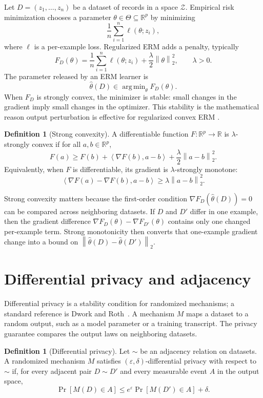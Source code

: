 \documentclass[11pt,a4paper]{report}
\theoremstyle{plain}
\theoremstyle{definition}
\newtheorem{definition}[theorem]{Definition}
\theoremstyle{remark}
\DeclareMathOperator*{\argmin}{arg\,min}
\newcommand{\R}{\mathbb{R}}
\newcommand{\cZ}{\mathcal{Z}}
\newcommand{\norm}[1]{\left\lVert #1\right\rVert}
\newcommand{\inner}[2]{\left\langle #1,#2\right\rangle}
\begin{document}
Let $D=(z_1,\ldots,z_n)$ be a dataset of records in a space $\cZ$.  Empirical risk minimization chooses a parameter $\theta\in\Theta\subseteq\R^p$ by minimizing
\[
    \frac{1}{n}\sum_{i=1}^n \ell(\theta;z_i),
\]
where $\ell$ is a per-example loss.  Regularized ERM adds a penalty, typically
\[
F_D(\theta)
=
\frac{1}{n}\sum_{i=1}^n\ell(\theta;z_i)
+
\frac{\lambda}{2}\norm{\theta}_2^2,
\qquad \lambda>0.
\]
The parameter released by an ERM learner is
\[
\hat\theta(D)\in\argmin_{\theta}F_D(\theta).
\]
When $F_D$ is strongly convex, the minimizer is stable: small changes in the gradient imply small changes in the optimizer.  This stability is the mathematical reason output perturbation is effective for regularized convex ERM \cite{chaudhuri2011erm}.

\begin{definition}[Strong convexity]
A differentiable function $F:\R^p\to\R$ is $\lambda$-strongly convex if for all $a,b\in\R^p$,
\[
F(a)\ge F(b)+\inner{\nabla F(b)}{a-b}+\frac{\lambda}{2}\norm{a-b}_2^2.
\]
Equivalently, when $F$ is differentiable, its gradient is $\lambda$-strongly monotone:
\[
\inner{\nabla F(a)-\nabla F(b)}{a-b}\ge \lambda\norm{a-b}_2^2.
\]
\end{definition}

Strong convexity matters because the first-order condition $\nabla F_D(\hat\theta(D))=0$ can be compared across neighboring datasets.  If $D$ and $D'$ differ in one example, then the gradient difference $\nabla F_D(\theta)-\nabla F_{D'}(\theta)$ contains only one changed per-example term.  Strong monotonicity then converts that one-example gradient change into a bound on $\norm{\hat\theta(D)-\hat\theta(D')}_2$.

\section{Differential privacy and adjacency}
\label{sec:bg-dp}

Differential privacy is a stability condition for randomized mechanisms; a standard reference is Dwork and Roth~\cite{dwork2014book}.  A mechanism $M$ maps a dataset to a random output, such as a model parameter or a training transcript.  The privacy guarantee compares the output laws on neighboring datasets.

\begin{definition}[Differential privacy]
Let $\sim$ be an adjacency relation on datasets.  A randomized mechanism $M$ satisfies $(\varepsilon,\delta)$-differential privacy with respect to $\sim$ if, for every adjacent pair $D\sim D'$ and every measurable event $A$ in the output space,
\[
\Pr[M(D)\in A]\le e^\varepsilon \Pr[M(D')\in A]+\delta.
\]
\end{definition}
\end{document}
